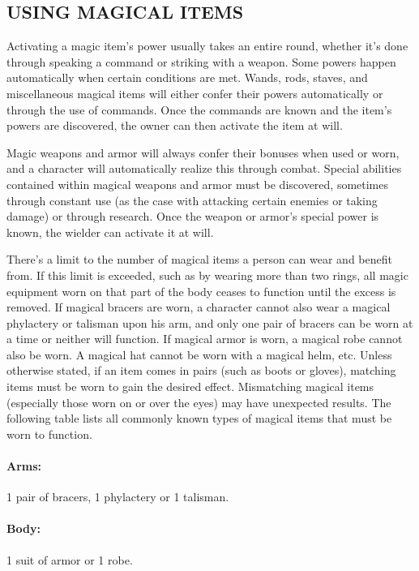 \begin{multicols}{2}
 
\subsection{USING MAGICAL ITEMS}

Activating a magic item's power usually takes an entire round, whether it's done through speaking a command or striking with a weapon.  Some powers happen automatically when certain conditions are met.  Wands, rods, staves, and miscellaneous magical items will either confer their powers automatically or through the use of commands.  Once the commands are known and the item's powers are discovered, the owner can then activate the item at will.

Magic weapons and armor will always confer their bonuses when used or worn, and a character will automatically realize this through combat.  Special abilities contained within magical weapons and armor must be discovered, sometimes through constant use (as the case with attacking certain enemies or taking damage) or through research.  Once the weapon or armor's special power is known, the wielder can activate it at will.

There's a limit to the number of magical items a person can wear and benefit from.  If this limit is exceeded, such as by wearing more than two rings, all magic equipment worn on that part of the body ceases to function until the excess is removed.  If magical bracers are worn, a character cannot also wear a magical phylactery or talisman upon his arm, and only one pair of bracers can be worn at a time or neither will function.  If magical armor is worn, a magical robe cannot also be worn.  A magical hat cannot be worn with a magical helm, etc.  Unless otherwise stated, if an item comes in pairs (such as boots or gloves), matching items must be worn to gain the desired effect. Mismatching magical items (especially those worn on or over the eyes) may have unexpected results.  The following table lists all commonly known types of magical items that must be worn to function.

\paragraph{Arms:} 1 pair of bracers, 1 phylactery or 1 talisman.

\paragraph{Body:} 1 suit of armor or 1 robe.


\end{multicols}
